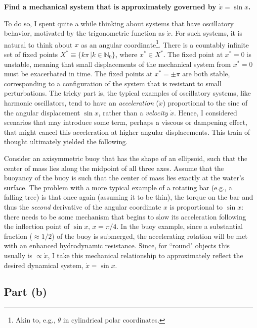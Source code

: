 \documentclass[draft]{agujournal2019}
\begin{document}
\textbf{Find a mechanical system that is approximately governed by $\dot x=\sin{x}$.}
\par
To do so, I spent quite a while thinking about systems that have oscillatory behavior, motivated by the trigonometric function as $\dot x$. For such systems, it is natural to think about $x$ as an angular coordinate\footnote{Akin to, e.g., $\theta$ in cylindrical polar coordinates.}. There is a countably infinite set of fixed points $X^*\equiv\{k\pi\,|k\in\mathbb{N}_0\}$, where $x^* \in X^*$. The fixed point at $x^*=0$ is unstable, meaning that small displacements of the mechanical system from $x^*=0$ must be exacerbated in time. The fixed points at $x^*=\pm\pi$ are both stable, corresponding to a configuration of the system that is resistant to small perturbations. The tricky part is, the typical examples of oscillatory systems, like harmonic oscillators, tend to have an \emph{acceleration} ($\ddot x$) proportional to the sine of the angular displacement $\sin{x}$, rather than a \emph{velocity} $\dot x$. Hence, I considered scenarios that may introduce some term, perhaps a viscous or dampening effect, that might cancel this acceleration at higher angular displacements. This train of thought ultimately yielded the following.
\par
Consider an axisymmetric buoy that has the shape of an ellipsoid, such that the center of mass lies along the midpoint of all three axes. Assume that the buoyancy of the buoy is such that the center of mass lies exactly at the water's surface. The problem with a more typical example of a rotating bar (e.g., a falling tree) is that once again (assuming it to be thin), the torque on the bar and thus the \emph{second} derivative of the angular coordinate $x$ is proportional to $\sin{x}$: there needs to be some mechanism that begins to slow its acceleration following the inflection point of $\sin{x}$, $x=\pi/4$. In the buoy example, since a substantial fraction ($\approx1/2$) of the buoy is submerged, the accelerating rotation will be met with an enhanced hydrodynamic resistance. Since, for ``round" objects this usually is $\propto\dot x$, I take this mechanical relationship to approximately reflect the desired dynamical system, $\dot x = \sin{x}$.




\subsection{Part (b)}
\label{subsec:p1a}
\end{document}
